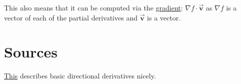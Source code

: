 \documentclass[letterpaper]{article}
\begin{document}
This also means that it can be computed via the \href{20200830000157-gradients.org}{gradient}: \(\nabla f \cdot \vec{\textbf{v}}\) as \(\nabla f\) is a vector of each of the partial derivatives and \(\vec{\textbf{v}}\) is a vector.

\section{Sources}
\label{sec:org2b42483}
\href{https://www.khanacademy.org/math/multivariable-calculus/multivariable-derivatives/partial-derivative-and-gradient-articles/a/directional-derivative-introduction}{This} describes basic directional derivatives nicely.
\end{document}
